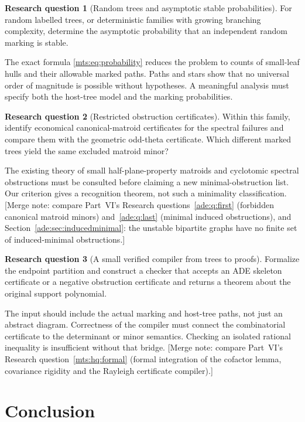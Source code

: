 \documentclass[11pt]{article}
\numberwithin{equation}{section}
\theoremstyle{definition}
\newtheorem{question}{Research question}%
\begin{document}
\begin{question}[Random trees and asymptotic stable probabilities]\label{mts:q:random}
For random labelled trees, or deterministic families with growing branching
complexity, determine the asymptotic probability that an independent
random marking is stable.
\end{question}
The exact formula \eqref{mts:eq:probability} reduces the problem to counts of
small-leaf hulls and their allowable marked paths. Paths and stars show
that no universal order of magnitude is possible without hypotheses.
A meaningful analysis must specify both the host-tree model and the
marking probabilities.

\begin{question}[Restricted obstruction certificates]\label{mts:q:certificates}
Within this family, identify economical canonical-matroid certificates
for the spectral failures and compare them with the geometric odd-theta
certificate. Which different marked trees yield the same excluded matroid
minor?
\end{question}
The existing theory of small half-plane-property matroids
\cite{KummerSert} and cyclotomic spectral obstructions \cite{McKeeSmythIMRN}
must be consulted before claiming a new minimal-obstruction list. Our
criterion gives a recognition theorem, not such a minimality classification.
[Merge note: compare Part~VI's Research questions~\ref{ade:q:first}
(forbidden canonical matroid minors) and~\ref{ade:q:last} (minimal induced
obstructions), and Section~\ref{ade:sec:inducedminimal}: the unstable
bipartite graphs have no finite set of induced-minimal obstructions.]

\begin{question}[A small verified compiler from trees to proofs]\label{mts:q:compiler}
Formalize the endpoint partition and construct a checker that accepts
an ADE skeleton certificate or a negative obstruction certificate and
returns a theorem about the original support polynomial.
\end{question}
The input should include the actual marking and host-tree paths, not
just an abstract diagram. Correctness of the compiler must connect the
combinatorial certificate to the determinant or minor semantics. Checking
an isolated rational inequality is insufficient without that bridge.
[Merge note: compare Part~VI's Research question~\ref{mts:hq:formal}
(formal integration of the cofactor lemma, covariance rigidity and the
Rayleigh certificate compiler).]

\section{Conclusion}
\end{document}
